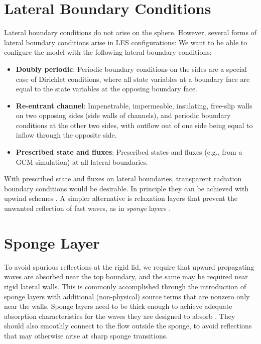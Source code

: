 \documentclass{report}
\begin{document}
\section{Lateral Boundary Conditions}

Lateral boundary conditions do not arise on the sphere. However, several forms of lateral boundary conditions arise in LES configurations: We want to be able to configure the model with the following lateral boundary conditions:
\begin{itemize}
    \item \textbf{Doubly periodic}: Periodic boundary conditions on the sides are a special case of Dirichlet conditions, where all state variables at a boundary face are equal to the state variables at the opposing boundary face.
    \item \textbf{Re-entrant channel}: Impenetrable, impermeable, insulating, free-slip walls on two opposing sides (side walls of channels), and periodic boundary conditions at the other two sides, with outflow out of one side being equal to inflow through the opposite side. 
    \item \textbf{Prescribed state and fluxes}: Prescribed states and fluxes (e.g., from a GCM simulation) at all lateral boundaries. 
\end{itemize}
With prescribed state and fluxes on lateral boundaries, transparent radiation boundary conditions would be desirable. In principle they can be achieved with upwind schemes \citep{Davies14a}. A simpler alternative is relaxation layers that prevent the unwanted reflection of fast waves, as in \textit{sponge} layers \citep{Davies76a}.

\section{Sponge Layer}\label{s:sponge}

To avoid spurious reflections at the rigid lid, we require that upward propagating waves are absorbed near the top boundary, and the same may be required near rigid lateral walls. This is commonly accomplished through the introduction of sponge layers with additional (non-physical) source terms that are nonzero only near the walls. Sponge layers need to be thick enough to achieve adequate absorption characteristics for the waves they are designed to absorb \citep{durran:1983}. They should also smoothly connect to the flow outside the sponge, to avoid reflections that may otherwise arise at sharp sponge transitions. 
\end{document}
